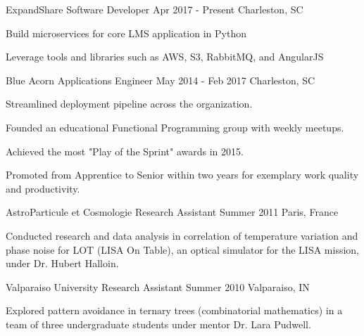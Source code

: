 

\begin{cventries}

  \cventry
    {ExpandShare}
    {Software Developer}
    {Apr 2017 - Present}
    {Charleston, SC}
    {
      \begin{cvitems}
        \item {Build microservices for core LMS application in Python}
        \item {Leverage tools and libraries such as AWS, S3, RabbitMQ, and AngularJS}
      \end{cvitems}
    }

  \cventry
    {Blue Acorn} %
    {Applications Engineer} %
    {May 2014 - Feb 2017} %
    {Charleston, SC} %
    {
      \begin{cvitems} %
        \item {Streamlined deployment pipeline across the organization.}
        \item {Founded an educational Functional Programming group with weekly meetups.}
        \item {Achieved the most "Play of the Sprint" awards in 2015.}
        \item {Promoted from Apprentice to Senior within two years for exemplary work quality and productivity.}
      \end{cvitems}
    }

  \cventry
    {AstroParticule et Cosmologie}
    {Research Assistant}
    {Summer 2011}
    {Paris, France}
    {
      \begin{cvitems}
        \item {Conducted research and data analysis in correlation of temperature variation and phase noise for LOT (LISA On Table), an optical simulator for the LISA mission, under Dr. Hubert Halloin.}
      \end{cvitems}
    }

  \cventry
    {Valparaiso University}
    {Research Assistant}
    {Summer 2010}
    {Valparaiso, IN}
    {
      \begin{cvitems}
        \item {Explored pattern avoidance in ternary trees (combinatorial mathematics) in a team of three undergraduate students under mentor Dr. Lara Pudwell.}
      \end{cvitems}
    }

\end{cventries}
